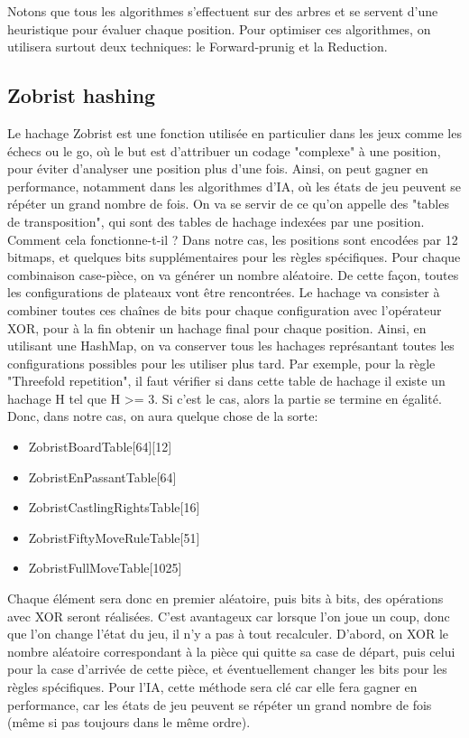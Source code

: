 \documentclass{article}
\begin{document}
\par Notons que tous les algorithmes s'effectuent sur des arbres et se servent d'une heuristique pour évaluer chaque position. Pour optimiser ces algorithmes, 
on utilisera surtout deux techniques: le Forward-prunig et la Reduction.

\subsection{Zobrist hashing} \label{Zobrist}
Le hachage Zobrist est une fonction utilisée en particulier dans les jeux comme les échecs ou le go, où le but est d'attribuer un codage "complexe" à
une position, pour éviter d'analyser une position plus d'une fois. Ainsi, on peut gagner en performance, notamment dans les algorithmes d'IA, où les
états de jeu peuvent se répéter un grand nombre de fois. On va se servir de ce qu'on appelle des "tables de transposition", qui sont des tables de
hachage indexées par une position. Comment cela fonctionne-t-il ? Dans notre cas, les positions sont encodées par 12 bitmaps, et quelques bits
supplémentaires pour les règles spécifiques. Pour chaque combinaison case-pièce, on va générer un nombre aléatoire. De cette façon, toutes les configurations
de plateaux vont être rencontrées. Le hachage va consister à combiner toutes ces chaînes de bits pour chaque configuration avec l'opérateur XOR,
pour à la fin obtenir un hachage final pour chaque position. Ainsi, en utilisant une HashMap, on va conserver tous les hachages représantant toutes les
configurations possibles pour les utiliser plus tard. Par exemple, pour la règle "Threefold repetition", il faut vérifier si dans cette table de hachage
il existe un hachage H tel que H >= 3. Si c'est le cas, alors la partie se termine en égalité.
\\Donc, dans notre cas, on aura quelque chose de la sorte:\\
\begin{itemize}
    \item ZobristBoardTable[64][12]
    \item ZobristEnPassantTable[64]
    \item ZobristCastlingRightsTable[16]
    \item ZobristFiftyMoveRuleTable[51]
    \item ZobristFullMoveTable[1025]
\end{itemize}

\par Chaque élément sera donc en premier aléatoire, puis bits à bits, des opérations avec XOR seront réalisées. C'est avantageux car lorsque l'on joue
un coup, donc que l'on change l'état du jeu, il n'y a pas à tout recalculer. D'abord, on XOR le nombre aléatoire correspondant à la pièce qui quitte
sa case de départ, puis celui pour la case d'arrivée de cette pièce, et éventuellement changer les bits pour les règles spécifiques.
Pour l'IA, cette méthode sera clé car elle fera gagner en performance, car les états de jeu peuvent se répéter un grand nombre de fois (même si pas
toujours dans le même ordre).
\end{document}
